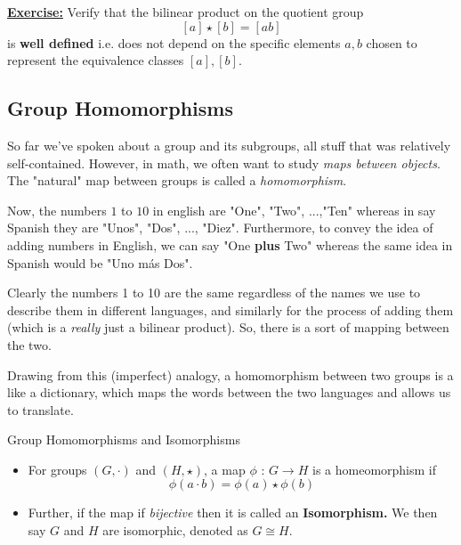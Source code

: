 \documentclass[11pt]{article}
\begin{document}
\vskip 0.5cm

\begin{dottedbox}
\underline{\textbf{Exercise:}} Verify that the bilinear product on the quotient group
\[ [a] \star [b] = [a b] \]
is \textbf{well defined} i.e. does not depend on the specific elements $a, b$ chosen to represent the equivalence classes $[a], [b]$.
\end{dottedbox}

\vskip 1cm
\subsection{Group Homomorphisms}
\vskip 0.5cm
So far we've spoken about a group and its subgroups, all stuff that was relatively self-contained. However, in math, we often want to study \emph{maps between objects}. The "natural" map between groups is called a \emph{homomorphism}.

\vskip 0.5cm
Now, the numbers $1$ to $10$ in english are "One", "Two", ...,"Ten" whereas in say Spanish they are "Unos", "Dos", ..., "Diez". Furthermore, to convey the idea of adding numbers in English, we can say "One \textbf{plus} Two" whereas the same idea in Spanish would be "Uno más Dos".

\vskip 0.5cm
Clearly the numbers 1 to 10 are the same regardless of the names we use to describe them in different languages, and similarly for the process of adding them (which is a \emph{really} just a bilinear product). So, there is a sort of mapping between the two.

\vskip 0.5cm
Drawing from this (imperfect) analogy, a homomorphism between two groups is a like a dictionary, which maps the words between the two languages and allows us to translate. 

\vskip 0.5cm
\begin{mathdefinitionbox}{Group Homomorphisms and Isomorphisms}
\vskip 0.5cm
\begin{itemize}
  \item For groups $(G, \cdot)$ and $(H, \star)$, a map $\phi \text{ : } G \rightarrow H$ is a homeomorphism if 
  \[ \phi(a \cdot b) = \phi(a) \star \phi(b) \]

  \item Further, if the map if \emph{bijective} then it is called an \textbf{Isomorphism.} We then say $G$ and $H$ are isomorphic, denoted as $G \cong H$.
\end{itemize}
\end{mathdefinitionbox}
\end{document}
